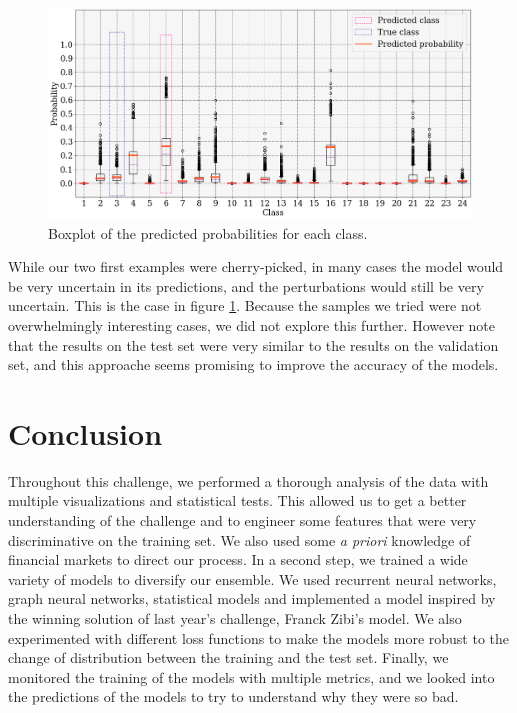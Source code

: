 \documentclass[switch, 11pt]{article}
\begin{document}
\begin{multicols}{2}
\begin{figure}[H]
        \centering
        \includegraphics[width=\columnwidth]{figures/predictions_3.png}
        \caption{Boxplot of the predicted probabilities for each class.}
        \label{fig:predictions_3}
    \end{figure}
    While our two first examples were cherry-picked, in many cases the model would be very uncertain in its predictions, and the perturbations would still be very uncertain. This is the case in figure \ref{fig:predictions_3}. Because the samples we tried were not overwhelmingly interesting cases, we did not explore this further. However note that the results on the test set were very similar to the results on the validation set, and this approache seems promising to improve the accuracy of the models.

    \section{Conclusion}
    Throughout this challenge, we performed a thorough analysis of the data with multiple visualizations and statistical tests. This allowed us to get a better understanding of the challenge and to engineer some features that were very discriminative on the training set. We also used some \textit{a priori} knowledge of financial markets to direct our process. In a second step, we trained a wide variety of models to diversify our ensemble. We used recurrent neural networks, graph neural networks, statistical models and implemented a model inspired by the winning solution of last year's challenge, Franck Zibi's model. We also experimented with different loss functions to make the models more robust to the change of distribution between the training and the test set. Finally, we monitored the training of the models with multiple metrics, and we looked into the predictions of the models to try to understand why they were so bad.


\end{multicols}
\end{document}
